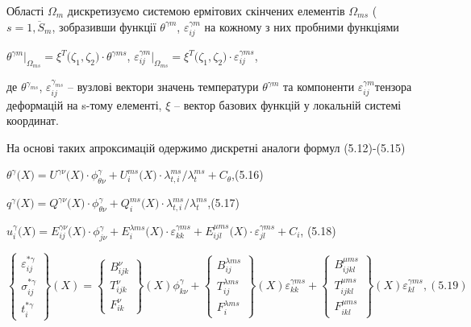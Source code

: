 Області $\Omega_m$ дискретизуємо системою ермітових скінчених елементів $\Omega_{ms}$ ($s = \overline{1,S_{m}}$, 
зобразивши функції $\theta^{\gamma m}$, $\varepsilon_{ij}^{\gamma m}$ на кожному з них пробними функціями

$\theta^{\mathit{\gamma m}}{|_{\Omega_{\mathit{\text{ms}}}} = \xi^{T}}{(\zeta_{1}}{,\zeta_{2}}{) \cdot \theta^{\gamma\mathit{\text{ms}}}}$,
$\varepsilon_{\mathit{\text{ij}}}^{\mathit{\gamma m}}{|_{\Omega_{\mathit{\text{ms}}}} = \xi^{T}}{(\zeta_{1}}{,\zeta_{2}}{) \cdot \varepsilon_{\mathit{\text{ij}}}^{\gamma\mathit{\text{ms}}}}$,

\noindent де $\theta^{\gamma_{ms}}$, $\varepsilon_{ij}^{\gamma_{ms}}$ -- вузлові вектори значень температури 
$\theta^{\gamma m}$ та компоненти $\varepsilon_{\mathit{\text{ij}}}^{\mathit{\gamma m}} $тензора деформацій на s-тому 
елементі, $\xi$ -- вектор базових функцій у локальній системі координат.

На основі таких апроксимацій одержимо дискретні аналоги формул (5.12)-(5.15)

$\theta^{\gamma}(X{) = U^{\gamma \nu}}(X{{) \cdot \phi_{\theta \nu}^{\gamma}} + U_{i}^{\mathit{\text{ms}}}}(X{{) \cdot \lambda_{t,i}^{\mathit{\text{ms}}}/\lambda_{t}^{\mathit{\text{ms}}}} + C_{\theta}}$,(5.16)

$q^{\gamma}(X{) = Q^{\gamma \nu}}(X{{) \cdot \phi_{\theta \nu}^{\gamma}} + Q_{i}^{\mathit{\text{ms}}}}(X{) \cdot \lambda_{t,i}^{\mathit{\text{ms}}}/\lambda_{t}^{\mathit{\text{ms}}}}$,(5.17)

$u_{i}^{\gamma}(X{) = E_{\mathit{\text{ij}}}^{\gamma \nu}}(X{{) \cdot \phi_{\mathit{j\nu}}^{\gamma}} + E_{i}^{\lambda\mathit{\text{ms}}}}(X{{) \cdot \varepsilon_{\mathit{\text{kk}}}^{\gamma\mathit{\text{ms}}}} + E_{\mathit{\text{ijl}}}^{\mu\mathit{\text{ms}}}}(X{{) \cdot \varepsilon_{\mathit{\text{jl}}}^{\gamma\mathit{\text{ms}}}} + C_{i}}$,
(5.18)

\begin{equation*}
    \left\{ \begin{array}{lr} \varepsilon_{ij}^{*\gamma} \\ \sigma_{ij}^{*\gamma} \\ t_{i}^{*\gamma} \end{array} \right \} (X) =
    \left\{ \begin{array}{lr} B_{ijk}^\nu \\ T_{ijk}^\nu \\ F_{ik}^\nu \end{array} \right \} (X) \phi_{k \nu}^\gamma + 
    \left\{ \begin{array}{lr} B_{ij}^{\lambda m s} \\ T_{ij}^{\lambda m s} \\ F_{i}^{\lambda m s} \end{array} \right \} (X) \varepsilon_{kk}^{\gamma m s} + 
    \left\{ \begin{array}{lr} B_{ijkl}^{\mu m s} \\ T_{ijkl}^{\mu m s} \\ F_{ikl}^{\mu m s} \end{array} \right \} (X) \varepsilon_{kl}^{\gamma m s}, (5.19)
\end{equation*}

